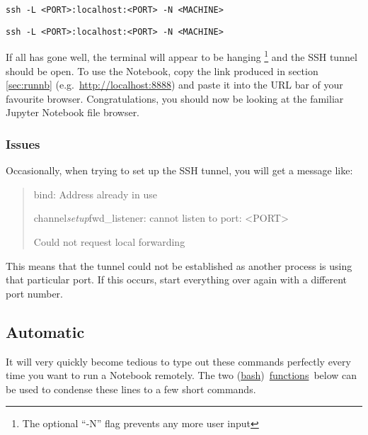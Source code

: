 \documentclass[a4paper]{article}
\begin{document}
\begin{lstlisting}[caption={Tunnel to gateway server}, label={lst:tunnel1}]
ssh -L <PORT>:localhost:<PORT> -N <MACHINE>
\end{lstlisting}

\begin{lstlisting}[caption={Tunnel to machine}, label={lst:tunnel2}]
ssh -L <PORT>:localhost:<PORT> -N <MACHINE>
\end{lstlisting}

If all has gone well, the terminal will appear to be hanging \footnote{The optional ``-N'' flag prevents any more user input} and the SSH tunnel should be open.
To use the Notebook, copy the link produced in section \ref{sec:runnb} (e.g.~\url{http://localhost:8888}) and paste it into the URL bar of your favourite browser. 
Congratulations, you should now be looking at the familiar Jupyter Notebook file browser. 

\subsubsection{Issues}

Occasionally, when trying to set up the SSH tunnel, you will get a message like:
\begin{quote}
bind: Address already in use

channel\emph{setup}fwd\_listener: cannot listen to port: \textless{}PORT\textgreater{}

Could not request local forwarding
\end{quote}

This means that the tunnel could not be established as another process is using that particular port. If this occurs, start everything over again with a different port number.

\subsection{Automatic}
\label{sec:auto}

It will very quickly become tedious to type out these commands perfectly every time you want to run a Notebook remotely.
The two (\href{http://cs.lmu.edu/~ray/notes/bash/}{bash})~\href{https://www.shellscript.sh/functions.html}{functions}~below can be used to condense these lines to a few short commands.


\end{document}

